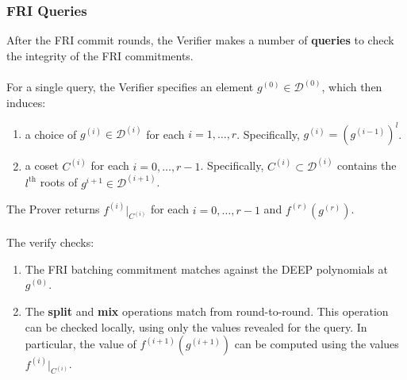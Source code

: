 \documentclass[10pt,letterpaper,titlepage]{article}
\newcommand{\D}[0]{\mathcal{D}}
\theoremstyle{definition}
\begin{document}
\begin{appendices}
\subsubsection*{FRI Queries}
\label{queries}
After the FRI commit rounds, the Verifier makes a number of \textbf{queries} to check the integrity of the FRI commitments. \\
\\
For a single query, the Verifier specifies an element $g^{(0)}\in\D^{(0)}$, which then induces:
\begin{enumerate}
  \item a choice of $g^{(i)}\in\D^{(i)}$ for each $i=1,\ldots,r$. Specifically, $g^{(i)}=(g^{(i-1)})^l$.
  \item a coset $C^{(i)}$ for each $i=0,\ldots,r-1$. Specifically, $C^{(i)}\subset\D^{(i)}$ contains the $l^\text{th}$ roots of $g^{i+1}\in\D^{(i+1)}$.
\end{enumerate}
The Prover returns $f^{(i)}|_{C^{(i)}}$ for each $i=0,\ldots,r-1$ and $f^{(r)}(g^{(r)})$. \\
\\
The verify checks:
\begin{enumerate}
  \item The FRI batching commitment matches against the DEEP polynomials at $g^{(0)}$.
  \item The \textbf{split} and \textbf{mix} operations match from round-to-round.
  This operation can be checked locally, using only the values revealed for the query.
  In particular, the value of $f^{(i+1)}(g^{(i+1)})$ can be computed using the values $f^{(i)}|_{C^{(i)}}$.\\
\end{enumerate}


\end{appendices}
\end{document}
